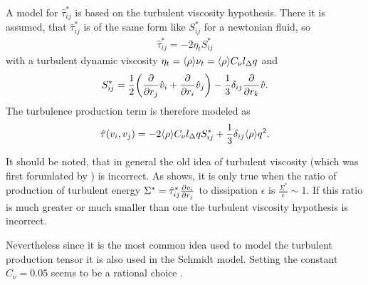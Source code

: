 A model for $\hat{\tau}^*_{ij}$ is based on the turbulent viscosity
hypothesis.
There it is assumed, that $\hat{\tau}^*_{ij}$ is of the same form like
$S^*_{ij}$ for a newtonian fluid, so
\begin{align}
\hat{\tau}^*_{ij}=- 2 \eta_t S^*_{ij}
\end{align}
with a turbulent dynamic viscosity
$\eta_t=\fil{\rho}\nu_t=\fil{\rho}C_{\nu}l_{\Delta} q$ and
\begin{align}
S^*_{ij}=\frac{1}{2}\lra{\pd{r_j}\hat{v}_i+\pd{r_i}\hat{v}_j}
-\frac{1}{3}\delta_{ij}\pd{r_k}\hat{v}.
\end{align}
The turbulence production term is therefore modeled as
\begin{align}
\hat{\tau}(v_i,v_j)=-2\fil{\rho}C_{\nu} l_{\Delta} q
S^*_{ij}+\frac{1}{3}\delta_{ij}\fil{\rho}q^2.
\end{align}

It should be noted, that in general the old idea of turbulent viscosity
(which was first forumlated by \citet{Boussinesq1877}) is
incorrect. As \citet{Pope2000} shows, it
is only true when the ratio of production of turbulent energy
$\Sigma^*=\hat{\tau}^*_{ij}\ppd{r_j}{v_i}$ to dissipation $\epsilon$ is
$\frac{\Sigma^*}{\epsilon}\sim 1$. If this ratio is much greater or much
smaller than one the turbulent viscosity hypothesis is incorrect. 

Nevertheless since it is the most common idea used to model the turbulent
production tensor it is also used in the Schmidt model. Setting the
constant $C_{\nu}=0.05$ seems to be a rational choice \citep{Schmidt2006}.


